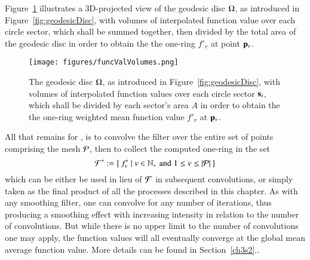 Figure~\ref{fig:funcValVolumes} illustrates a 3D-projected view of the geodesic disc $\Omega$, as introduced in Figure~\ref{fig:geodesicDisc}, with volumes of interpolated function value over each circle sector, which shall be summed together, then divided by the total area of the geodesic disc in order to obtain the the one-ring \wmfv{} $f'_v$ at point $\bp_v$.

\begin{figure}[ht]
\ffigbox
	{\texttt{[image: figures/funcValVolumes.png]}}
	{\caption[Weighted Mean Function Value $f'_v$at $\bp_v$]{The geodesic disc $\Omega$, as introduced in Figure~\ref{fig:geodesicDisc}, with volumes of interpolated function values over each circle sector $\mathbf{s}_i$, which shall be divided by each sector's area $A$ in order to obtain the the one-ring weighted mean function value $f'_v$ at $\bp_v$.}\label{fig:funcValVolumes}}
\end{figure}

All that remains for , is to convolve the filter over the entire set of points comprising the mesh $\mathcal{P}$, then to collect the computed one-ring  in the set
%
\begin{equation}
	\mathcal{F}' :=  \left \{\:f'_v \mid v \in \mathbb{N}, \;\text{and}\; 1\leq v \leq |\mathcal{P}|\:\right \}
	\label{eq:zeta}
\end{equation}%
%
%
which can be either be used in lieu of $\mathcal{F}$ in subsequent convolutions, or simply taken as the final product of all the processes described in this chapter. As with any smoothing filter, one can convolve  for any number of iterations, thus producing a smoothing effect with increasing intensity in relation to the number of convolutions. But while there is no upper limit to the number of convolutions one may apply, the function values will all eventually converge at the global mean average function value. More details can be found in Section~\ref{ch3s2}..

%
%
%
%
